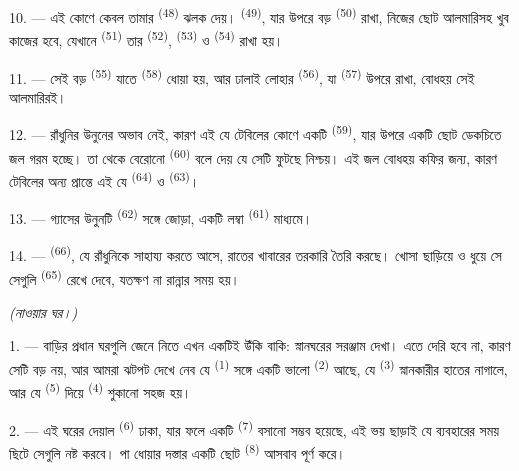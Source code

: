 10. --- এই কোণে কেবল তামার  \textsuperscript{(48)} ঝলক দেয়।
 \textsuperscript{(49)}, যার উপরে বড় 
\textsuperscript{(50)} রাখা, নিজের ছোট আলমারিসহ খুব কাজের হবে, যেখানে
 \textsuperscript{(51)} তার 
\textsuperscript{(52)},  \textsuperscript{(53)} ও
 \textsuperscript{(54)} রাখা হয়।

\VUsaut{4.0mm}
\VUsaut{3.0mm}

11. --- সেই বড়  \textsuperscript{(55)} যাতে 
\textsuperscript{(58)} ধোয়া হয়, আর ঢালাই লোহার 
\textsuperscript{(56)}, যা  \textsuperscript{(57)} উপরে রাখা,
বোধহয় সেই আলমারিরই।

12. --- রাঁধুনির উনুনের অভাব নেই, কারণ এই যে টেবিলের কোণে একটি  \textsuperscript{(59)}, যার উপরে একটি ছোট ডেকচিতে জল গরম হচ্ছে। তা থেকে
বেরোনো  \textsuperscript{(60)} বলে দেয় যে সেটি ফুটছে নিশ্চয়। এই জল
বোধহয় কফির জন্য, কারণ টেবিলের অন্য প্রান্তে এই যে 
\textsuperscript{(64)} ও  \textsuperscript{(63)}।

13. --- গ্যাসের উনুনটি  \textsuperscript{(62)} সঙ্গে
জোড়া, একটি লম্বা  \textsuperscript{(61)} মাধ্যমে।

14. ---  \textsuperscript{(66)}, যে রাঁধুনিকে সাহায্য
করতে আসে, রাতের খাবারের তরকারি তৈরি করছে। খোসা ছাড়িয়ে ও ধুয়ে সে সেগুলি
 \textsuperscript{(65)} রেখে দেবে, যতক্ষণ না রান্নার সময় হয়।

\VUsaut{4.0mm}
{\centering\fontsize{10.2pt}{10.2pt}\selectfont{} \textit{(নাওয়ার ঘর।)}\par}
\VUsaut{3.0mm}

1. --- বাড়ির প্রধান ঘরগুলি জেনে নিতে এখন একটিই উঁকি বাকি: স্নানঘরের
সরঞ্জাম দেখা। এতে দেরি হবে না, কারণ সেটি বড় নয়, আর আমরা ঝটপট দেখে নেব যে
 \textsuperscript{(1)} সঙ্গে একটি ভালো  \textsuperscript{(2)} আছে, যে  \textsuperscript{(3)}
স্নানকারীর হাতের নাগালে, আর যে  \textsuperscript{(5)}
দিয়ে  \textsuperscript{(4)} শুকানো সহজ হয়।

2. --- এই ঘরের দেয়াল  \textsuperscript{(6)} ঢাকা, যার
ফলে একটি  \textsuperscript{(7)} বসানো সম্ভব হয়েছে, এই ভয় ছাড়াই
যে ব্যবহারের সময় ছিটে সেগুলি নষ্ট করবে। পা ধোয়ার দস্তার একটি ছোট
 \textsuperscript{(8)} আসবাব পূর্ণ করে।
\VUsaut{6.0mm}
\VUfilet{22mm}
